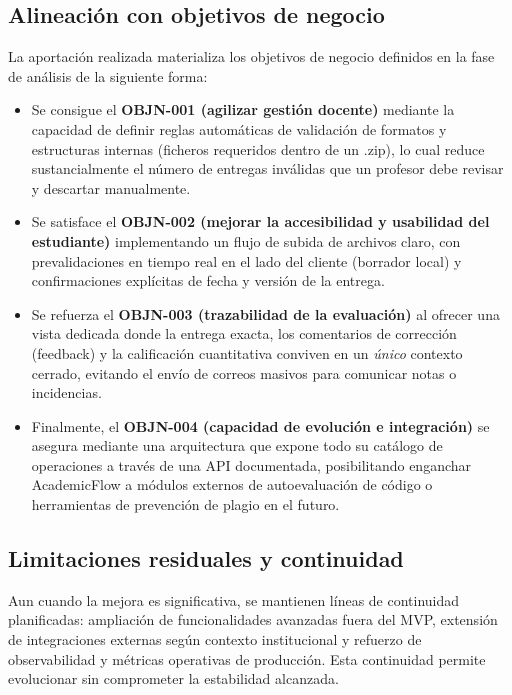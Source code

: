 \subsection{Alineaci\'on con objetivos de negocio}

La aportaci\'on realizada materializa los objetivos de negocio definidos en la fase de an\'alisis de la siguiente forma:
\begin{itemize}
  \item Se consigue el \textbf{OBJN-001 (agilizar gesti\'on docente)} mediante la capacidad de definir reglas autom\'aticas de validaci\'on de formatos y estructuras internas (ficheros requeridos dentro de un .zip), lo cual reduce sustancialmente el n\'umero de entregas inv\'alidas que un profesor debe revisar y descartar manualmente.
  \item Se satisface el \textbf{OBJN-002 (mejorar la accesibilidad y usabilidad del estudiante)} implementando un flujo de subida de archivos claro, con prevalidaciones en tiempo real en el lado del cliente (borrador local) y confirmaciones expl\'icitas de fecha y versi\'on de la entrega.
  \item Se refuerza el \textbf{OBJN-003 (trazabilidad de la evaluaci\'on)} al ofrecer una vista dedicada donde la entrega exacta, los comentarios de correcci\'on (feedback) y la calificaci\'on cuantitativa conviven en un \emph{\'unico} contexto cerrado, evitando el env\'io de correos masivos para comunicar notas o incidencias.
  \item Finalmente, el \textbf{OBJN-004 (capacidad de evoluci\'on e integraci\'on)} se asegura mediante una arquitectura que expone todo su cat\'alogo de operaciones a trav\'es de una API documentada, posibilitando enganchar AcademicFlow a m\'odulos externos de autoevaluaci\'on de c\'odigo o herramientas de prevenci\'on de plagio en el futuro.
\end{itemize}

\subsection{Limitaciones residuales y continuidad}

Aun cuando la mejora es significativa, se mantienen l\'ineas de continuidad planificadas: ampliaci\'on de funcionalidades avanzadas fuera del MVP, extensi\'on de integraciones externas seg\'un contexto institucional y refuerzo de observabilidad y m\'etricas operativas de producci\'on. Esta continuidad permite evolucionar sin comprometer la estabilidad alcanzada.

